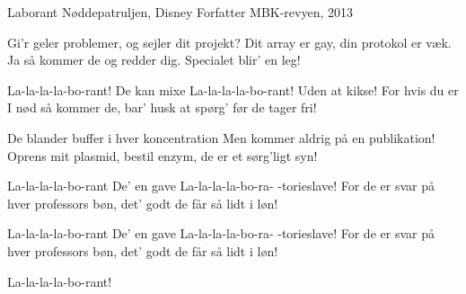 \begin{song}{Laborant}
  {} %
  {Nøddepatruljen, Disney} %
  {Forfatter} %
  {MBK-revyen, 2013} %
  {\NotCCLIed} %

  \begin{SBVerse}
    Gi'r geler problemer,
    og sejler dit projekt?
    Dit array er gay,
    din protokol er væk.
    Ja så kommer de og redder dig.
    Specialet blir' en leg!
  \end{SBVerse}

  \begin{SBChorus}
    La-la-la-la-bo-rant!
    De kan mixe
    La-la-la-la-bo-rant!
    Uden at kikse!
    For hvis du er I nød så kommer de,
    bar' husk at spørg' før de tager fri!
  \end{SBChorus}

  \begin{SBVerse}
    De blander buffer
    i hver koncentration
    Men kommer aldrig
    på en publikation!
    Oprens mit plasmid, bestil enzym,
    de er et sørg'ligt syn!
  \end{SBVerse}

  \begin{SBChorus}
    La-la-la-la-bo-rant
    De' en gave
    La-la-la-la-bo-ra-
    -torieslave!
    For de er svar på hver professors bøn,
    det' godt de får så lidt i løn!
  \end{SBChorus}

  \begin{SBChorus}
    La-la-la-la-bo-rant
    De' en gave
    La-la-la-la-bo-ra-
    -torieslave!
    For de er svar på hver professors bøn,
    det' godt de får så lidt i løn!
  \end{SBChorus}


  \begin{SBSection*}
    La-la-la-la-bo-rant!
  \end{SBSection*}
\end{song}